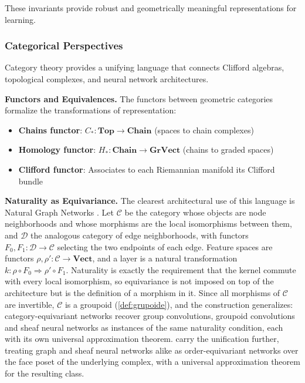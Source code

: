 These invariants provide robust and geometrically meaningful representations for learning.

\subsubsection{Categorical Perspectives}

Category theory provides a unifying language that connects Clifford algebras, topological complexes, and neural network architectures.

\textbf{Functors and Equivalences.}\label{rem:funtores_equivalencias} The functors between geometric categories formalize the transformations of representation:
\begin{itemize}
    \item \textbf{Chains functor}: $C_*: \textbf{Top} \to \textbf{Chain}$ (spaces to chain complexes)
    \item \textbf{Homology functor}: $H_*: \textbf{Chain} \to \textbf{GrVect}$ (chains to graded spaces)
    \item \textbf{Clifford functor}: Associates to each Riemannian manifold its Clifford bundle
\end{itemize}
\textbf{Naturality as Equivariance.} The clearest architectural use of this language is Natural Graph Networks \citep{dehaan2020natural}. Let $\mathcal{C}$ be the category whose objects are node neighborhoods and whose morphisms are the local isomorphisms between them, and $\mathcal{D}$ the analogous category of edge neighborhoods, with functors $F_0, F_1: \mathcal{D} \to \mathcal{C}$ selecting the two endpoints of each edge. Feature spaces are functors $\rho, \rho': \mathcal{C} \to \mathbf{Vect}$, and a layer is a natural transformation $k: \rho \circ F_0 \Rightarrow \rho' \circ F_1$. Naturality is exactly the requirement that the kernel commute with every local isomorphism, so equivariance is not imposed on top of the architecture but is the definition of a morphism in it. Since all morphisms of $\mathcal{C}$ are invertible, $\mathcal{C}$ is a groupoid (\autoref{def:grupoide}), and the construction generalizes: category-equivariant networks \citep{maruyama2025categorical} recover group convolutions, groupoid convolutions and sheaf neural networks as instances of the same naturality condition, each with its own universal approximation theorem. \citet{maruyama2026foundations} carry the unification further, treating graph and sheaf neural networks alike as order-equivariant networks over the face poset of the underlying complex, with a universal approximation theorem for the resulting class.


